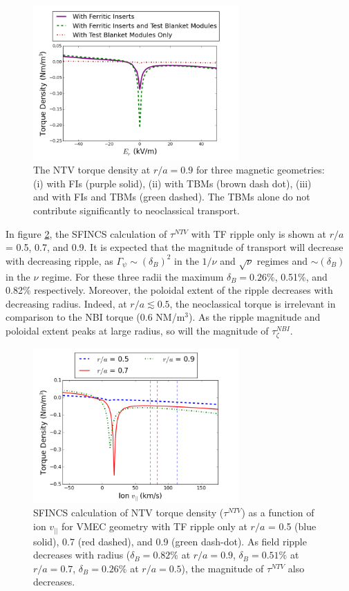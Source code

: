 \documentclass{article}
\begin{document}
\begin{figure}[h!]
\centering
\includegraphics[width=0.7\textwidth]{Torque_comparingTBMandFI.png}
\caption{\label{fig:Torque_comparingTBMandFI} The NTV torque density at $r/a = 0.9$ for three magnetic geometries: (i) with FIs (purple solid), (ii) with TBMs (brown dash dot), (iii) and with FIs and TBMs (green dashed). The TBMs alone do not contribute significantly to neoclassical transport. }
\end{figure}

In figure \ref{fig:Torque_radiusscaling}, the SFINCS calculation of $\tau^{NTV}$ with TF ripple only is shown at $r/a$ = 0.5, 0.7, and 0.9. It is expected that the magnitude of transport will decrease with decreasing ripple, as $\Gamma_{\psi} \sim (\delta_B)^2$ in the $1/\nu$ and $\sqrt{\nu}$ regimes and $\sim (\delta_B)$ in the $\nu$ regime. For these three radii the maximum $\delta_B = 0.26\%$, 0.51\%, and 0.82\% respectively. Moreover, the poloidal extent of the ripple decreases with decreasing radius. Indeed, at $r/a \lesssim 0.5$, the neoclassical torque is irrelevant in comparison to the NBI torque (0.6 NM/m$^3$). As the ripple magnitude and poloidal extent peaks at large radius, so will the magnitude of $\tau_{\zeta}^{NBI}$. 

\begin{figure}[h!]
\centering
\includegraphics[width=0.7\textwidth]
{Torque_radiusscaling.png}
\caption{\label{fig:Torque_radiusscaling} SFINCS calculation of NTV torque density ($\tau^{NTV}$) as a function of ion $v_{||}$ for VMEC geometry with TF ripple only at $r/a$ = 0.5 (blue solid), 0.7 (red dashed), and 0.9 (green dash-dot). As field ripple decreases with radius ($\delta_B = 0.82\%$ at $r/a = 0.9$, $\delta_B = 0.51\%$ at $r/a = 0.7$, $\delta_B = 0.26\%$ at $r/a = 0.5$), the magnitude of $\tau^{NTV}$ also decreases.}
\end{figure}
\end{document}
